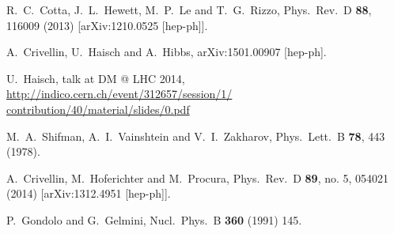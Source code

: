 \begin{thebibliography}{90}
  R.~C.~Cotta, J.~L.~Hewett, M.~P.~Le and T.~G.~Rizzo,
  Phys.\ Rev.\ D {\bf 88}, 116009 (2013)
  [arXiv:1210.0525 [hep-ph]].
  
  A.~Crivellin, U.~Haisch and A.~Hibbs,
  arXiv:1501.00907 [hep-ph].
  
 U.~Haisch, talk at DM @ LHC 2014,  \href{http://indico.cern.ch/event/312657/session/1/contribution/40/material/slides/0.pdf}{http://indico.cern.ch/event/312657/session/1/ contribution/40/material/slides/0.pdf}  
 
  M.~A.~Shifman, A.~I.~Vainshtein and V.~I.~Zakharov,
  Phys.\ Lett.\ B {\bf 78}, 443 (1978).
  
  A.~Crivellin, M.~Hoferichter and M.~Procura,
  Phys.\ Rev.\ D {\bf 89}, no. 5, 054021 (2014)
  [arXiv:1312.4951 [hep-ph]].
     
  


  P.~Gondolo and G.~Gelmini,
  Nucl.\ Phys.\ B {\bf 360} (1991) 145.

\end{thebibliography}
